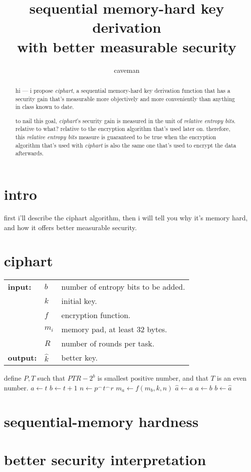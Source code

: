 \documentclass[twocolumn]{article}
\author{caveman}
\title{sequential memory-hard key derivation \\
with better measurable security}
\begin{document}
\maketitle
\begin{abstract}
hi --- i propose \emph{ciphart}, a sequential memory-hard key derivation
function that has a security gain that's measurable more objectively and
more conveniently than anything in class known to date.

to nail this goal, \emph{ciphart}'s security gain is measured in the unit
of \emph{relative entropy bits}.  relative to what?  relative to the
encryption algorithm that's used later on.  therefore, this \emph{relative
entropy bits} measure is guaranteed to be true when the encryption
algorithm that's used with \emph{ciphart} is also the same one that's used
to encrypt the data afterwards.
\end{abstract}

\tableofcontents

\section{intro}
first i'll describe the ciphart algorithm, then i will tell you why it's
memory hard, and how it offers better measurable security.

\section{ciphart}

\begin{tabular}{lll}
    \textbf{input:}  & $b$ & number of entropy bits to be added.\\
            & $k$ & initial key.\\
            & $f$ & encryption function.\\
            & $m_i$ & memory pad, at least $32$ bytes.\\
            & $R$ & number of rounds per task.\\
    \textbf{output:} & $\hat k$ & better key.\\
\end{tabular}
\begin{algorithmic}[1]
    \STATE define $P,T$ such that $PTR - 2^b$ is smallest positive number,
    and that $T$ is an even number.
            \STATE $a \leftarrow t$
            \STATE $b \leftarrow t+1$
                \STATE $n \leftarrow p ^\frown t ^\frown r$
                \STATE $m_a \leftarrow f(m_b, k, n)$
                \STATE $\hat a \leftarrow a$
                \STATE $a \leftarrow b$
                \STATE $b \leftarrow \hat a$
            \ENDFOR
        \ENDFOR
    \ENDFOR
\end{algorithmic}

\section{sequential-memory hardness}
\section{better security interpretation}
\end{document}
